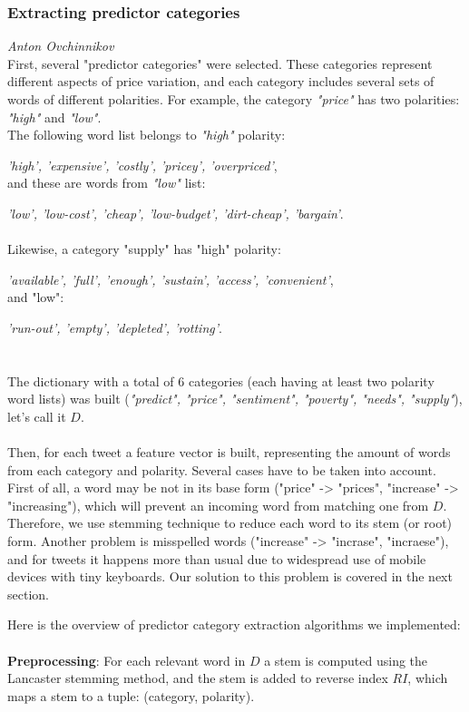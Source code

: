 \subsubsection*{Extracting predictor categories}
\emph{Anton Ovchinnikov} \\
First, several "predictor categories" were selected. These categories represent different aspects of price variation, and each category includes several sets of words of different polarities. For example, the category \emph{"price"} has two polarities: \emph{"high"} and \emph{"low"}.
\\
The following word list belongs to \emph{"high"} polarity:

\emph{'high', 'expensive', 'costly', 'pricey', 'overpriced'},
\\
and these are words from \emph{"low"} list:

\emph{'low', 'low-cost', 'cheap', 'low-budget', 'dirt-cheap', 'bargain'}.
\\ \\
Likewise, a category "supply" has "high" polarity:

\emph{'available', 'full', 'enough', 'sustain', 'access', 'convenient'},
\\
and "low":

\emph{'run-out', 'empty', 'depleted', 'rotting'}.
\\ \\ \\
The dictionary with a total of 6 categories (each having at least two polarity word lists) was built (\emph{"predict", "price", "sentiment", "poverty", "needs", "supply"}), let's call it $D$.
\\ \\
Then, for each tweet a feature vector is built, representing the amount of words from each category and polarity. Several cases have to be taken into account. First of all, a word may be not in its base form ("price" -> "prices", "increase" -> "increasing"), which will prevent an incoming word from matching one from $D$. Therefore, we use stemming technique to reduce each word to its stem (or root) form. Another problem is misspelled words ("increase" -> "incrase", "incraese"), and for tweets it happens more than usual due to widespread use of mobile devices with tiny keyboards. Our solution to this problem is covered in the next section.

Here is the overview of predictor category extraction algorithms we implemented:\\ \\
\textbf{Preprocessing}: For each relevant word in $D$ a stem is computed using the Lancaster stemming method, and the stem is added to reverse index $RI$, which maps a stem to a tuple: (category, polarity). \\


